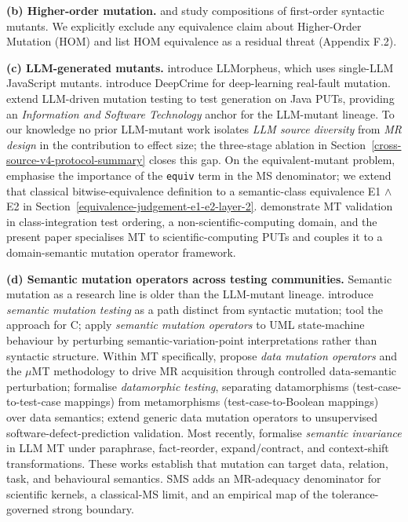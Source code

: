 \documentclass[manuscript,screen,review]{acmart}
\begin{document}
\textbf{(b) Higher-order mutation.} \citet{c03829bdd1a6e45113092384bf0fa05a064ca54a} and \citet{kintis2018effective}
study compositions of first-order syntactic mutants. We
explicitly exclude any equivalence claim about Higher-Order Mutation
(HOM) and list HOM equivalence as a residual threat (Appendix F.2).

\textbf{(c) LLM-generated mutants.} \citet{tip2025llmorpheus}
introduce LLMorpheus, which uses single-LLM JavaScript mutants.
\citet{humbatova2021deepcrime} introduce DeepCrime for
deep-learning real-fault mutation. \citet{dakhel2024llm} extend
LLM-driven mutation testing to test generation on Java PUTs, providing
an \emph{Information and Software Technology} anchor for the LLM-mutant
lineage. To our knowledge no prior LLM-mutant work isolates \emph{LLM
source diversity} from \emph{MR design} in the contribution to effect
size; the three-stage ablation in Section~\ref{cross-source-v4-protocol-summary} closes this gap. On the
equivalent-mutant problem, \citet{delgadoperez2020equivalent} emphasise
the importance of the \texttt{equiv} term in the MS denominator; we
extend that classical bitwise-equivalence definition to a semantic-class
equivalence E1 $\wedge$ E2 in Section~\ref{equivalence-judgement-e1-e2-layer-2}. \citet{zhang2021classintegration} demonstrate MT
validation in class-integration test ordering, a
non-scientific-computing domain, and the present paper specialises MT to
scientific-computing PUTs and couples it to a domain-semantic mutation
operator framework.

\textbf{(d) Semantic mutation operators across testing communities.}
Semantic mutation as a research line is older than the LLM-mutant
lineage. \citet{7a6c280d9584691800e71876c716ea229335abeb} introduce \emph{semantic
mutation testing} as a path distinct from syntactic mutation; \citet{dan2012smtc}
tool the approach for C; \citet{derezinska2019uml}
apply \emph{semantic mutation operators} to UML state-machine behaviour
by perturbing semantic-variation-point interpretations rather than
syntactic structure. Within MT specifically, \citet{sun2016mumt,sun2024datamutation}
propose \emph{data mutation operators} and the $\mu$MT methodology to drive
MR acquisition through controlled data-semantic perturbation; \citet{zhu2020datamorphic}
formalise \emph{datamorphic testing}, separating
datamorphisms (test-case-to-test-case mappings) from metamorphisms
(test-case-to-Boolean mappings) over data semantics; \citet{chan2024metamorphic}
extend generic data mutation operators to unsupervised
software-defect-prediction validation. Most recently, \citet{0fa97cc4e2a0ffb6a777669b1b541c0372fac0d2}
formalise \emph{semantic invariance} in LLM MT under paraphrase,
fact-reorder, expand/contract, and context-shift transformations. These
works establish that mutation can target data, relation, task, and
behavioural semantics. SMS adds an MR-adequacy denominator for
scientific kernels, a classical-MS limit, and an empirical map of the
tolerance-governed strong boundary.
\end{document}
